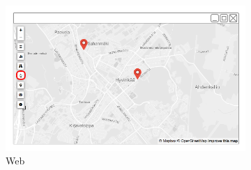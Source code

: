 \begin{figure}[ht]
    \centering
    \begin{subfigure}[b]{0.6\textwidth}
        \includegraphics[width=\textwidth]
          {img/c02-application/png/web-basemap-search.png}
        \caption{Web}
    \end{subfigure}
    ~
    \begin{subfigure}[b]{0.2\textwidth}

\end{subfigure}
\end{figure}
